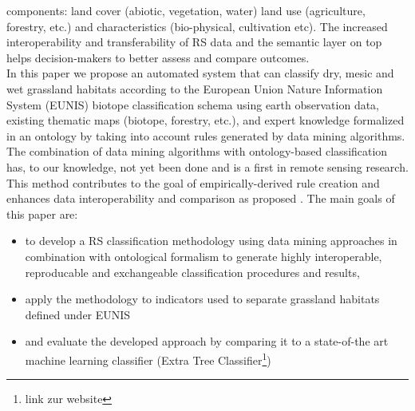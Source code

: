 \documentclass[authoryear, review,12pt,number]{elsarticle}
\begin{document}
components: land cover (abiotic, vegetation, water) land use (agriculture,
forestry, etc.) and characteristics (bio-physical, cultivation etc). The
increased interoperability and transferability of RS data and the semantic layer
on top helps decision-makers to better assess and compare outcomes. 
\\ 
In this paper we propose an automated system that can classify dry, mesic and
wet grassland habitats according to the European Union Nature Information System
(EUNIS) biotope classification schema using earth observation data, existing
thematic maps (biotope, forestry, etc.), and expert knowledge formalized in an
ontology by taking into account rules generated by data mining algorithms. The
combination of data mining algorithms with ontology-based classification has, to
our knowledge, not yet been done and is a first in remote sensing research. 
This method contributes to the goal of empirically-derived rule creation and enhances data interoperability and
comparison as proposed \cite{Janowicz2012}.
The main goals of this paper are:
\begin{itemize}
 \item to develop a RS classification methodology using data mining approaches
     in combination with ontological formalism to generate highly interoperable,
     reproducable and exchangeable classification procedures and results,
 \item apply the methodology to indicators used to separate grassland habitats
     defined under EUNIS
 \item and evaluate the developed approach by comparing it to a state-of-the art
     machine learning classifier (Extra Tree Classifier\footnote{link zur
     website})
\end{itemize}

\end{document}
